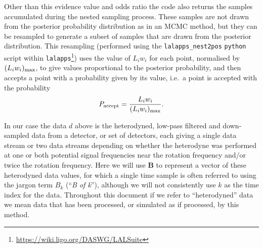 Other than this evidence value and odds ratio the code also returns the samples accumulated during
the nested sampling process. These samples are not drawn from the posterior probability distribution as in
an MCMC method, but they can be resampled to generate a subset of samples that are drawn from the posterior
distribution. This resampling (performed using the {\tt lalapps\_nest2pos} {\tt python} script within
{\tt lalapps}\footnote{\url{https://wiki.ligo.org/DASWG/LALSuite}}) uses the
value of $L_i w_i$ for each point, normalised by $(L_iw_i)_{\rm max}$, to give values proportional to the
posterior probability, and then accepts a point with a probability given by its value, i.e.\ a point is
accepted with the probability
\begin{equation}\label{eq:postaccept}
P_{\text{accept}} = \frac{L_i w_i}{(L_iw_i)_{\rm max}}.
\end{equation}

In our case the data $d$ above is the heterodyned, low-pass filtered and down-sampled data
from a detector, or set of detectors, each giving a single data stream or two data streams depending on
whether the heterodyne was performed at one or both potential signal frequencies near the rotation frequency
and/or twice the rotation frequency. Here we will use $\mathbf{B}$ to represent a vector of these heterodyned
data values, for which a single time sample is often referred to using the jargon term $B_k$ (``{\it B of k}''), although we will
not consistently use $k$ as the time index for the data. Throughout this document if we refer to ``heterodyned'' data we mean
data that has been processed, or simulated as if processed, by this method.
